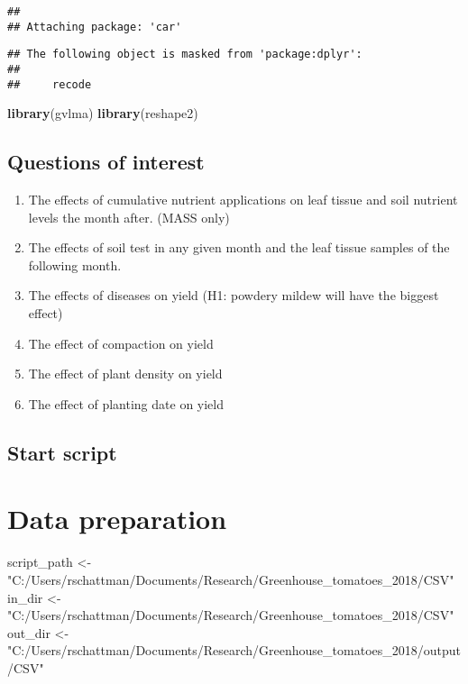 \documentclass[]{article}
\newenvironment{Shaded}{\begin{snugshade}}{\end{snugshade}}
\newcommand{\KeywordTok}[1]{\textcolor[rgb]{0.13,0.29,0.53}{\textbf{{#1}}}}
\newcommand{\StringTok}[1]{\textcolor[rgb]{0.31,0.60,0.02}{{#1}}}
\newcommand{\NormalTok}[1]{{#1}}
\providecommand{\tightlist}{%
  \setlength{\itemsep}{0pt}\setlength{\parskip}{0pt}}
\begin{document}
\begin{verbatim}
## 
## Attaching package: 'car'
\end{verbatim}

\begin{verbatim}
## The following object is masked from 'package:dplyr':
## 
##     recode
\end{verbatim}

\begin{Shaded}
\begin{Highlighting}[]
\KeywordTok{library}\NormalTok{(gvlma)}
\KeywordTok{library}\NormalTok{(reshape2)}
\end{Highlighting}
\end{Shaded}

\subsection{Questions of interest}\label{questions-of-interest}

\begin{enumerate}
\def\labelenumi{\arabic{enumi}.}
\tightlist
\item
  The effects of cumulative nutrient applications on leaf tissue and
  soil nutrient levels the month after. (MASS only)
\item
  The effects of soil test in any given month and the leaf tissue
  samples of the following month.
\item
  The effects of diseases on yield (H1: powdery mildew will have the
  biggest effect)
\item
  The effect of compaction on yield
\item
  The effect of plant density on yield
\item
  The effect of planting date on yield
\end{enumerate}

\subsection{Start script}\label{start-script}

\section{Data preparation}\label{data-preparation}

\begin{Shaded}
\begin{Highlighting}[]
\NormalTok{script_path <-}\StringTok{ "C:/Users/rschattman/Documents/Research/Greenhouse_tomatoes_2018/CSV"}
\NormalTok{in_dir <-}\StringTok{ "C:/Users/rschattman/Documents/Research/Greenhouse_tomatoes_2018/CSV"}
\NormalTok{out_dir <-}\StringTok{ "C:/Users/rschattman/Documents/Research/Greenhouse_tomatoes_2018/output/CSV"}
\end{Highlighting}
\end{Shaded}
\end{document}
